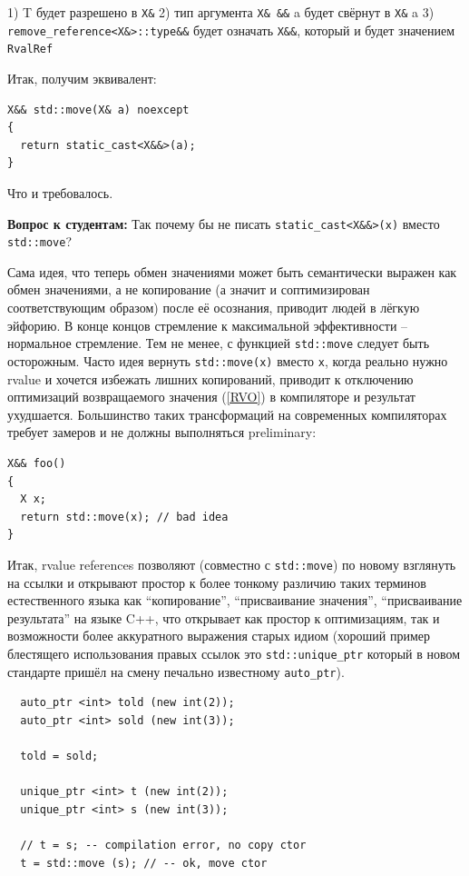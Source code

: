 \documentclass[a4paper,12pt,oneside]{article}
\newif\ifanswers
\begin{document}
1) T будет разрешено в \lstinline!X&!
2) тип аргумента \lstinline!X& &&! a будет свёрнут в \lstinline!X&! a
3) \lstinline!remove_reference<X&>::type&&! будет означать \lstinline!X&&!, который и будет значением \lstinline!RvalRef!

Итак, получим эквивалент:

\begin{lstlisting}
X&& std::move(X& a) noexcept
{  
  return static_cast<X&&>(a);
}
\end{lstlisting}

Что и требовалось.

\textbf{Вопрос к студентам:} Так почему бы не писать \lstinline!static_cast<X&&>(x)! вместо \lstinline!std::move!?

\ifanswers
Правильный ответ: заворачивание в шаблон в данном случае позволяет неявный вывод шаблонного параметра, что делает запись удобней. А так пожалуйста.
\fi

Сама идея, что теперь обмен значениями может быть семантически выражен как обмен значениями, а не копирование (а значит и соптимизирован соответствующим образом) после её осознания, приводит людей в лёгкую эйфорию. В конце концов стремление к максимальной эффективности -- нормальное стремление. Тем не менее, с функцией \lstinline!std::move! следует быть осторожным. Часто идея вернуть \lstinline!std::move(x)! вместо \lstinline!x!, когда реально нужно rvalue и хочется избежать лишних копирований, приводит к отключению оптимизаций возвращаемого значения (\ref{RVO}) в компиляторе и результат ухудшается. Большинство таких трансформаций на современных компиляторах требует замеров и не должны выполняться preliminary:

\begin{lstlisting}
X&& foo()
{
  X x;
  return std::move(x); // bad idea
}
\end{lstlisting}

Итак, rvalue references позволяют (совместно с \lstinline!std::move!) по новому взглянуть на ссылки и открывают простор к более тонкому различию таких терминов естественного языка как ``копирование'', ``присваивание значения'', ``присваивание результата'' на языке C++, что открывает как простор к оптимизациям, так и возможности более аккуратного выражения старых идиом (хороший пример блестящего использования правых ссылок это \lstinline!std::unique_ptr! который в новом стандарте пришёл на смену печально известному \lstinline!auto_ptr!). 

\begin{lstlisting}
  auto_ptr <int> told (new int(2));
  auto_ptr <int> sold (new int(3));

  told = sold;

  unique_ptr <int> t (new int(2));
  unique_ptr <int> s (new int(3));

  // t = s; -- compilation error, no copy ctor
  t = std::move (s); // -- ok, move ctor
\end{lstlisting}
\end{document}
